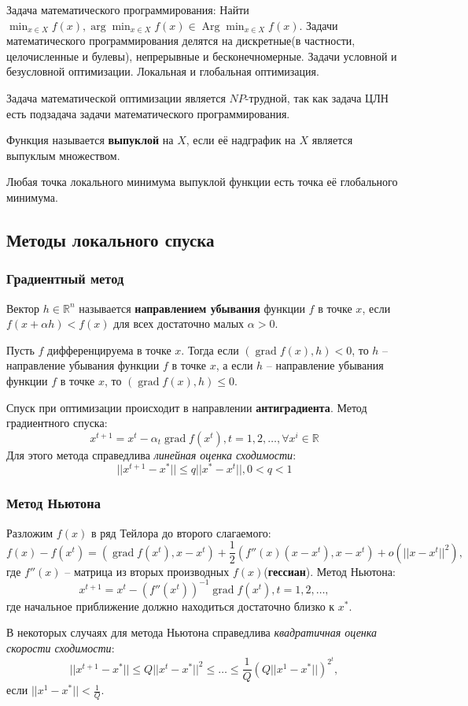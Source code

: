 \documentclass[11pt]{article}
\newcounter{th}\setcounter{th}{0}
\newcounter{stnmt}\setcounter{stnmt}{0}
\def\st{\par\smallskip\refstepcounter{stnmt}\textbf{\arabic{stnmt}}}
\newtheorem*{Statement}{Утверждение \st}
\begin{document}
Задача математического программирования:
Найти $\min_{x \in X} f(x), \operatorname{arg}\min_{x \in X}f(x) \in \operatorname{Arg}\min_{x \in X}f(x)$.
Задачи математического программирования делятся на дискретные(в частности, целочисленные
и булевы), непрерывные и бесконечномерные. Задачи условной
и безусловной оптимизации. Локальная и глобальная оптимизация.

Задача математической оптимизации является $NP$-трудной, так как задача ЦЛН есть подзадача задачи
математического программирования.

Функция называется \textbf{выпуклой} на \(X\), если её надграфик на \(X\) является выпуклым множеством.
\begin{Statement}
Любая точка локального минимума выпуклой функции есть точка её глобального минимума.
\end{Statement}
\subsection{Методы локального спуска}
\label{sec:orgbacf8b6}
\subsubsection{Градиентный метод}
\label{sec:org30cc344}
  Вектор $h \in \mathbb{R}^n$ называется \textbf{направлением убывания} функции $f$ в точке $x$, если $f(x + \alpha h) < f(x)$
  для всех достаточно малых $\alpha > 0$.
  \begin{Statement}
  Пусть $f$ дифференцируема в точке $x$. Тогда если $(\operatorname{grad} f(x), h) < 0$, то $h$ -- направление
  убывания функции $f$ в точке $x$, а если $h$ -- направление убывания функции $f$ в точке $x$, то $(\operatorname{grad} f(x), h) \leq 0$.
  \end{Statement}
  Спуск при оптимизации происходит в направлении \textbf{антиградиента}. Метод градиентного спуска:
  \begin{equation}
  x^{t + 1} = x^t - \alpha_t\operatorname{grad} f(x^t), t = 1, 2, \ldots, \forall x^i \in \mathbb{R}
  \end{equation}
  Для этого метода справедлива \textit{линейная оценка сходимости}:
\begin{equation}
||x^{t + 1} - x^*|| \leq q||x^* - x^t||, 0 < q < 1
\end{equation}
\subsubsection{Метод Ньютона}
\label{sec:orgcf3325d}
Разложим \(f(x)\) в ряд Тейлора до второго слагаемого:
\begin{equation}
f(x) - f(x^t) = (\operatorname{grad}f(x^t), x - x^t) + \frac12(f''(x)(x - x^t), x - x^t) + o(||x - x^t||^2),
\end{equation}
где $f''(x)$ -- матрица из вторых производных $f(x)$(\textbf{гессиан}). Метод Ньютона:
\begin{equation}
x^{t + 1} = x^t - (f''(x^t))^{-1}\operatorname{grad} f(x^t), t = 1, 2, \ldots,
\end{equation}
где начальное приближение должно находиться достаточно близко к $x^*$.

В некоторых случаях для метода Ньютона справедлива \textit{квадратичная оценка скорости сходимости}:
\begin{equation}
||x^{t + 1} - x^*|| \leq Q||x^t - x^*||^2 \leq \ldots \leq \frac1Q(Q||x^1 - x^*||)^{2^t},
\end{equation}
если $||x^1 - x^*|| < \frac1Q$.
\end{document}
